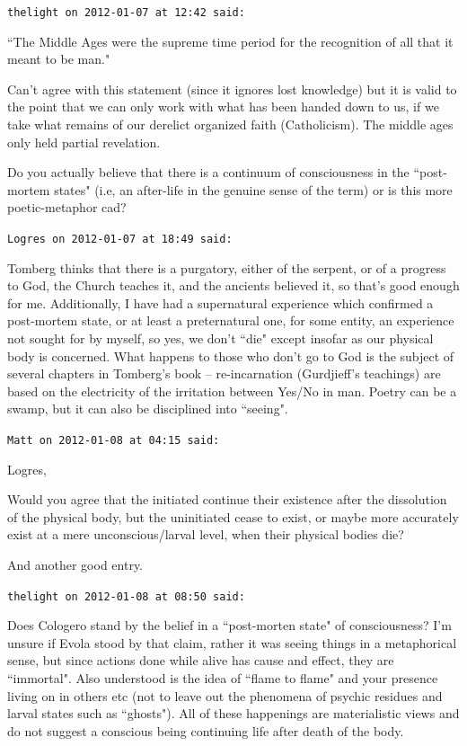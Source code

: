 \begin{footnotesize}\begin{sffamily}



\texttt{thelight on 2012-01-07 at 12:42 said: }

``The Middle Ages were the supreme time period for the recognition of all that it meant to be man." 

Can't agree with this statement (since it ignores lost knowledge) but it is valid to the point that we can only work with what has been handed down to us, if we take what remains of our derelict organized faith (Catholicism). The middle ages only held partial revelation. 

Do you actually believe that there is a continuum of consciousness in the ``post-mortem states" (i.e, an after-life in the genuine sense of the term) or is this more poetic-metaphor cad?


\hfill

\texttt{Logres on 2012-01-07 at 18:49 said: }

Tomberg thinks that there is a purgatory, either of the serpent, or of a progress to God, the Church teaches it, and the ancients believed it, so that's good enough for me. Additionally, I have had a supernatural experience which confirmed a post-mortem state, or at least a preternatural one, for some entity, an experience not sought for by myself, so yes, we don't ``die" except insofar as our physical body is concerned. What happens to those who don't go to God is the subject of several chapters in Tomberg's book – re-incarnation (Gurdjieff's teachings) are based on the electricity of the irritation between Yes/No in man. Poetry can be a swamp, but it can also be disciplined into ``seeing". 


\hfill

\texttt{Matt on 2012-01-08 at 04:15 said: }

Logres,

Would you agree that the initiated continue their existence after the dissolution of the physical body, but the uninitiated cease to exist, or maybe more accurately exist at a mere unconscious/larval level, when their physical bodies die?

And another good entry.


\hfill

\texttt{thelight on 2012-01-08 at 08:50 said: }

Does Cologero stand by the belief in a ``post-morten state" of consciousness? I'm unsure if Evola stood by that claim, rather it was seeing things in a metaphorical sense, but since actions done while alive has cause and effect, they are ``immortal". Also understood is the idea of ``flame to flame" and your presence living on in others etc (not to leave out the phenomena of psychic residues and larval states such as ``ghosts"). All of these happenings are materialistic views and do not suggest a conscious being continuing life after death of the body.


\end{sffamily}
\end{footnotesize}
